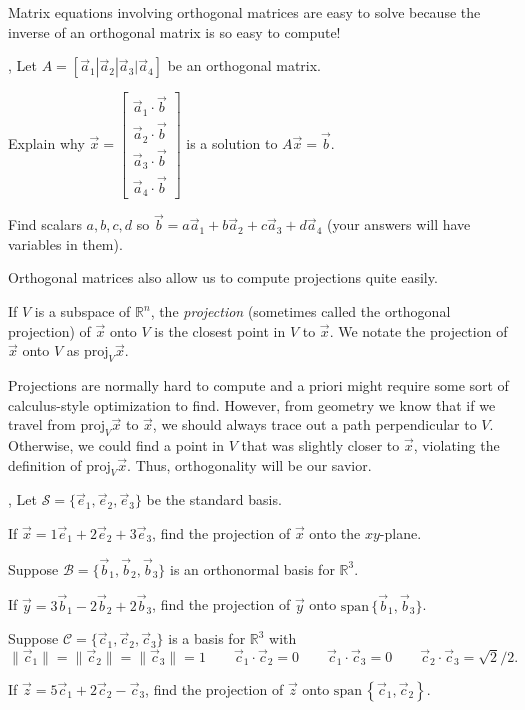 \documentclass{article}
\newcommand{\R}{\mathbb{R}}
\newcommand{\proj}{\mathrm{proj}}
\renewcommand{\span}{\mathrm{span}\,}
\newcommand{\mat}[1]{\begin{bmatrix}#1\end{bmatrix}}
\begin{document}
	Matrix equations involving orthogonal matrices are easy to solve because the
	inverse of an orthogonal matrix is so easy to compute!
	
	\sep
	Let $A=[\vec a_1|\vec a_2|\vec a_3|\vec a_4]$ be an orthogonal matrix.
	\begin{Enum}
		\item Explain why 
			$\vec x=\mat{\vec a_1\cdot \vec b\\
				     \vec a_2\cdot \vec b\\
			     	     \vec a_3\cdot \vec b\\
			     	     \vec a_4\cdot \vec b}$ is a solution to $A\vec x=\vec b$.
		\item Find scalars $a,b,c,d$ so $\vec b=a\vec a_1+b\vec a_2+c\vec a_3+d\vec a_4$
			(your answers will have variables in them).
	\end{Enum}

	Orthogonal matrices also allow us to compute projections quite easily.

	\begin{Def}
		If $V$ is a subspace of $\R^n$, the \emph{projection}
		(sometimes called the orthogonal projection) of $\vec x$ onto $V$
		is the closest point in $V$ to $\vec x$. We notate the projection
		of $\vec x$ onto $V$ as $\proj_V\vec x$.
	\end{Def}

	Projections are normally hard to compute and a priori might require some sort
	of calculus-style optimization to find.  However, from geometry we know that 
	if we travel from $\proj_V \vec x$ to $\vec x$, we should always trace out a path
	perpendicular to $V$.  Otherwise, we could find a point in $V$ that was slightly closer
	to $\vec x$, violating the definition of $\proj_V \vec x$.  Thus, orthogonality
	will be our savior.

	\sep
	Let $\mathcal S=\{\vec e_1,\vec e_2,\vec e_3\}$ be the standard basis.
	\begin{Enum}
		\item If $\vec x=1\vec e_1+2\vec e_2+3\vec e_3$, find the projection of $\vec x$
			onto the $xy$-plane.
	\end{Enum}
	Suppose $\mathcal B=\{\vec b_1,\vec b_2,\vec b_3\}$ is an orthonormal basis for $\R^3$.
	\begin{Enum}[resume]
		\item If $\vec y=3\vec b_1-2\vec b_2+2\vec b_3$, find the projection of $\vec y$
			onto $\span\{\vec b_1,\vec b_3\}$.
	\end{Enum}
	Suppose $\mathcal C=\{\vec c_1,\vec c_2,\vec c_3\}$ is a basis for $\R^3$ with
	\[
		\|\vec c_1\| = 
		\|\vec c_2\| = 
		\|\vec c_3\| = 1\qquad \vec c_1\cdot \vec c_2=0\qquad \vec c_1\cdot \vec c_3=0
		\qquad \vec c_2\cdot \vec c_3=\sqrt{2}/2.
	\]
	\vspace{-.35in}
	\begin{Enum}[resume]
		\item If $\vec z=5\vec c_1+2\vec c_2-\vec c_3$, find the projection of $\vec z$
			onto $\span\left\{\vec c_1,\vec c_2\right\}$.
	\end{Enum}
\end{document}
